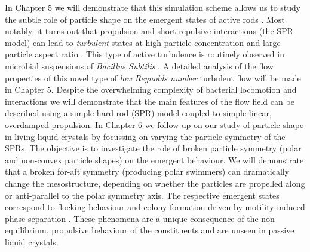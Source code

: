 \documentclass[amssymb]{revtex4}
\begin{document}
In Chapter 5 we will demonstrate that this simulation scheme allows us to study the subtle role  of particle shape on the emergent states of active rods \cite{2012wensinklowen}. Most notably, it turns out that propulsion and short-repulsive interactions (the SPR model) can lead to {\em turbulent} states at high particle concentration and large particle aspect ratio \cite{2012wensink_pnas}. This type of active turbulence is routinely observed in microbial suspensions of {\em Bacillus Subtilis} \cite{2007cisneros}. A detailed analysis of the flow properties of this novel type of {\em low Reynolds number} turbulent flow will be made in Chapter 5. Despite the overwhelming complexity of bacterial locomotion and interactions  we will demonstrate that the main features of the flow field can be described using a simple hard-rod (SPR) model coupled to simple linear, overdamped propulsion. In  Chapter 6 we follow up on our study of particle shape in living liquid crystals by focussing on  varying the particle symmetry of the SPRs. The objective is to investigate the role of broken particle symmetry (polar and non-convex particle shapes) on the emergent behaviour.  We will demonstrate that a broken for-aft symmetry (producing polar swimmers) can dramatically change the mesostructure, depending on whether the particles are propelled along or anti-parallel to the polar symmetry axis. The  respective emergent states correspond to flocking behaviour and colony formation driven by motility-induced phase separation \cite{catestailleur2015}.  These phenomena are a unique consequence of the non-equilibrium, propulsive behaviour of the constituents and are unseen in passive liquid crystals.



\end{document}
